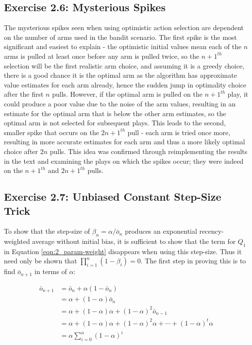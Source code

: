 \subsection*{Exercise 2.6: Mysterious Spikes}

The mysterious spikes seen when using optimistic action selection are dependent on the number of arms used in the bandit scenario. The first spike is the most significant and easiest to explain - the optimistic initial values mean each of the $n$ arms is pulled at least once before any arm is pulled twice, so the $n+1^{th}$ selection will be the first realistic arm choice, and assuming it is a greedy choice, there is a good chance it is the optimal arm as the algorithm has approximate value estimates for each arm already, hence the sudden jump in optimality choice after the first $n$ pulls. However, if the optimal arm is pulled on the $n + 1^{th}$ play, it could produce a poor value due to the noise of the arm values, resulting in an estimate for the optimal arm that is below the other arm estimates, so the optimal arm is not selected for subsequent plays. This leads to the second, smaller spike that occurs on the $2n + 1^{th}$ pull - each arm is tried once more, resulting in more accurate estimates for each arm and thus a more likely optimal choice after $2n$ pulls. This idea was confirmed through reimplementing the results in the text and examining the plays on which the spikes occur; they were indeed on the $n+1^{th}$ and $2n + 1^{th}$ pulls.

\subsection*{Exercise 2.7: Unbiased Constant Step-Size Trick}

To show that the step-size of $\beta_n = \alpha/\bar{o}_n$ produces an exponential recency-weighted average without initial bias, it is sufficient to show that the term for $Q_1$ in Equation \ref{eqn:2_param-weight} disappears when using this step-size. Thus it need only be shown that $\prod_{i=1}^{n}(1-\beta_i) = 0$. The first step in proving this is to find $\bar{o}_{n+1}$ in terms of $\alpha$:

\vspace{-6mm}
\begin{align*}
\bar{o}_{n+1} &= \bar{o}_n + \alpha(1 - \bar{o}_n) \\
&= \alpha + (1-\alpha)\bar{o}_n \\
&= \alpha + (1-\alpha)\alpha + (1-\alpha)^2\bar{o}_{n-1} \\
&= \alpha + (1-\alpha)\alpha + (1-\alpha)^2\alpha + \cdots + (1-\alpha)^t\alpha \\
&= \alpha\sum_{i=0}^{n}(1-\alpha)^i
\end{align*}

